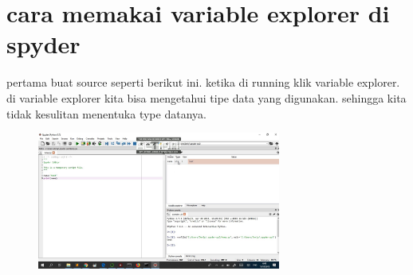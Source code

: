 \section{cara memakai variable explorer di spyder}
pertama buat source seperti berikut ini. ketika di running klik variable explorer. di variable explorer kita bisa mengetahui tipe data yang digunakan. sehingga kita tidak kesulitan menentuka type datanya.
\begin{figure}[H]
	\centering
	\includegraphics[width=8cm]{figures/far.jpg}
\end{figure}
